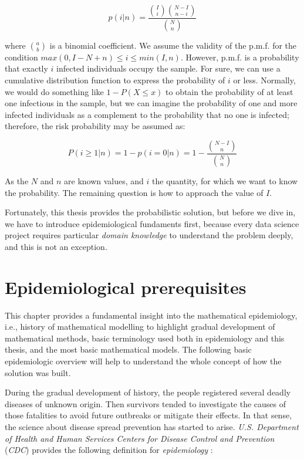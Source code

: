 \documentclass[
  digital, %
  oneside, %
  lof,     %
  lot,     %
]{fithesis4}
\begin{document}
\begin{equation}
  p(i|n) = \frac{ \binom{I}{i} \binom{N - I}{n - i} }{ \binom{N}{n} }
\end{equation}

where $\binom{a}{b}$ is a binomial coefficient.
We assume the validity of the p.m.f. for the condition $max\left( 0, I - N + n \right) \leq i \leq min\left( I, n \right)$.
However, p.m.f. is a probability that exactly $i$ infected individuals occupy the sample.
For sure, we can use a cumulative distribution function to express the probability of $i$ or less.
Normally, we would do something like $1 - P(X \leq x)$ to obtain the probability of at least one infectious in the sample, but we can imagine the probability of one and more infected individuals as a complement to the probability that no one is infected; therefore, the risk  probability may be assumed as:

\begin{equation}\label{eq:risk-theoretic}
  P(i \geq 1|n) = 1 - p(i=0|n) = 1 - \frac{
    \binom{N - I}{n}
  }{
    \binom{N}{n}
  }
\end{equation}

As the $N$ and $n$ are known values, and $i$ the quantity, for 
which we want to know the probability.
The remaining question is how to approach the value of $I$.

Fortunately, this thesis provides the probabilistic solution,
but before we dive in, we have to introduce
epidemiological fundaments first, because every data science
project requires particular \textit{domain knowledge} to
understand the problem deeply, and this is not an exception.


\chapter{Epidemiological prerequisites}
\label{chap:epidemiological-prerequisites}

This chapter provides a fundamental insight into the mathematical epidemiology, i.e., history of mathematical modelling to highlight gradual development of mathematical methods, basic terminology used both in epidemiology and this thesis, and the most basic mathematical models.
The following basic epidemiologic overview will help to understand the whole concept of how the solution was built.

During the gradual development of history, the people registered several deadly diseases of unknown origin.
Then survivors tended to investigate the causes of those fatalities to avoid future outbreaks or mitigate their effects.
In that sense, the science about disease spread prevention has started to arise.
\textit{U.S. Department of Health and Human Services Centers for Disease Control and Prevention} (\textit{CDC}) provides the following definition for \textit{epidemiology} \cite{cdc2006}:
\end{document}
